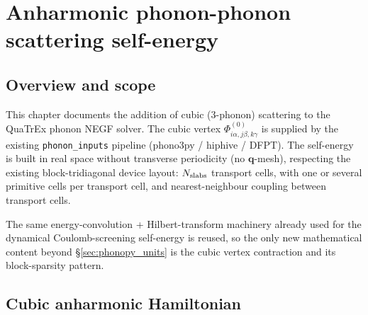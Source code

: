 %
%

\chapter{Anharmonic phonon-phonon scattering self-energy}
\label{ch:anharmonic_phph}

\section{Overview and scope}
\label{sec:phph_overview}

This chapter documents the addition of cubic ($3$-phonon) scattering to
the QuaTrEx phonon NEGF solver. The cubic vertex
$\Phi^{(0)}_{i\alpha,j\beta,k\gamma}$ is supplied by the existing
\texttt{phonon\_inputs} pipeline (phono3py / hiphive / DFPT). The
self-energy is built in real space without transverse periodicity (no
$\mathbf q$-mesh), respecting the existing block-tridiagonal device
layout: $N_{\rm slabs}$ transport cells, with one or several primitive
cells per transport cell, and nearest-neighbour coupling between
transport cells.

The same energy-convolution + Hilbert-transform machinery already used for
the dynamical Coulomb-screening self-energy is reused, so the only new
mathematical content beyond \S\ref{sec:phonopy_units} is the cubic
vertex contraction and its block-sparsity pattern.

\section{Cubic anharmonic Hamiltonian}
\label{sec:phph_hamiltonian}

